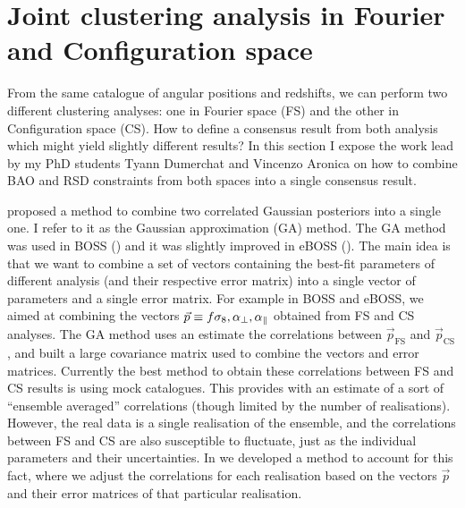 \section{Joint clustering analysis in Fourier and Configuration space}
\label{galaxies:joint}

From the same catalogue of angular positions and redshifts, we can perform 
two different clustering analyses: one in Fourier space (FS) and the other in 
Configuration space (CS). How to define a consensus result from both analysis 
which might yield slightly different results? In this section I expose the work 
lead by my PhD students Tyann Dumerchat and Vincenzo Aronica on how to combine  
BAO and RSD constraints from both spaces into a single consensus result. 

\cite{sanchezClusteringGalaxiesCompleted2017a} proposed a method to combine
two correlated Gaussian posteriors into a single one. I refer to it as the 
Gaussian approximation (GA) method. The GA method was used in 
BOSS (\cite{alamClusteringGalaxiesCompleted2017}) and it was slightly improved 
in eBOSS (\cite{bautistaCompletedSDSSIVExtended2021}). 
The main idea is that we want to combine a set of vectors containing the best-fit 
parameters of different analysis (and their respective error matrix) into a single vector 
of parameters and a single error matrix. 
For example in BOSS and eBOSS, we aimed at combining 
the vectors $\vec{p} \equiv {f\sigma_8, {\alpha_\perp}, {\alpha_\parallel}}$ obtained from FS and CS analyses. 
The GA method uses an estimate the correlations between $\vec{p}_\text{FS}$ and $\vec{p}_\text{CS}$,
and built a large covariance matrix used to combine the vectors and error matrices. 
Currently the best method to obtain these correlations between FS and CS results is using mock catalogues.
This provides with an estimate of a sort of ``ensemble averaged'' correlations (though limited by the 
number of realisations). However, the real data is a single realisation of the ensemble, and 
the correlations between FS and CS are also susceptible to fluctuate, just as the individual parameters 
and their uncertainties. In \cite{bautistaCompletedSDSSIVExtended2021} we developed 
a method to account for this fact, where we adjust the correlations for each realisation based on 
the vectors $\vec{p}$ and their error matrices of that particular realisation. 


